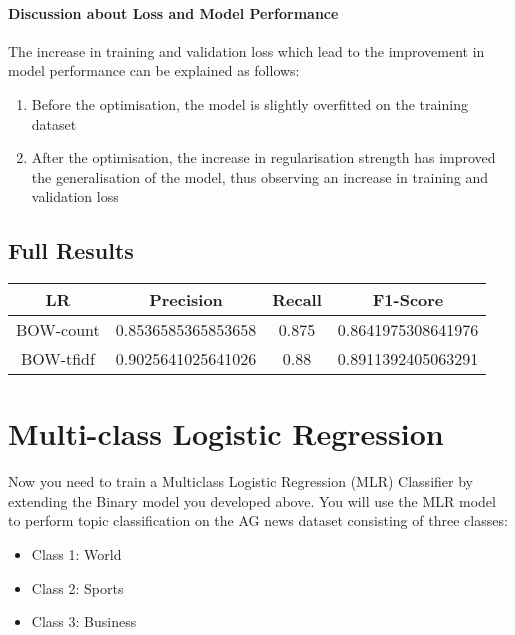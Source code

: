 \documentclass[11pt]{article}
\providecommand{\tightlist}{%
      \setlength{\itemsep}{0pt}\setlength{\parskip}{0pt}}
\begin{document}
\hypertarget{discussion-about-loss-and-model-performance}{%
\paragraph{Discussion about Loss and Model
Performance}\label{discussion-about-loss-and-model-performance}}

The increase in training and validation loss which lead to the
improvement in model performance can be explained as follows:

\begin{enumerate}
\def\labelenumi{\arabic{enumi}.}
\tightlist
\item
  Before the optimisation, the model is slightly overfitted on the
  training dataset
\item
  After the optimisation, the increase in regularisation strength has
  improved the generalisation of the model, thus observing an increase
  in training and validation loss
\end{enumerate}

    \hypertarget{full-results}{%
\subsection{Full Results}\label{full-results}}

\begin{longtable}[]{@{}cccc@{}}
\toprule
LR & Precision & Recall & F1-Score\tabularnewline
\midrule
\endhead
BOW-count & 0.8536585365853658 & 0.875 &
0.8641975308641976\tabularnewline
BOW-tfidf & 0.9025641025641026 & 0.88 &
0.8911392405063291\tabularnewline
\bottomrule
\end{longtable}

    \hypertarget{multi-class-logistic-regression}{%
\section{Multi-class Logistic
Regression}\label{multi-class-logistic-regression}}

Now you need to train a Multiclass Logistic Regression (MLR) Classifier
by extending the Binary model you developed above. You will use the MLR
model to perform topic classification on the AG news dataset consisting
of three classes:

\begin{itemize}
\tightlist
\item
  Class 1: World
\item
  Class 2: Sports
\item
  Class 3: Business
\end{itemize}
\end{document}
